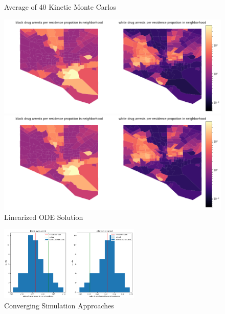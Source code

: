 \documentclass[10pt]{article}
\begin{document}
 \begin{figure}[!htb]
 \begin{minipage}{0.5\textwidth}
     \caption{Average of 40 Kinetic Monte Carlos}
     \centering
     \includegraphics[width=\textwidth]{imgs/km.png}
   \end{minipage}\hfill
   \begin{minipage}{0.5\textwidth}
     \caption{Linearized ODE Solution}
     \centering
     \includegraphics[width=\textwidth]{imgs/rk.png}
   \end{minipage}\hfill
 \end{figure}
 
    \begin{figure}[!htb]
    \begin{minipage}{\textwidth}
     \caption{Converging Simulation Approaches}
     \centering
     \includegraphics[width=0.6\textwidth]{imgs/kmandrk.png}
   \end{minipage}\hfill
 \end{figure}
 
\end{document}
